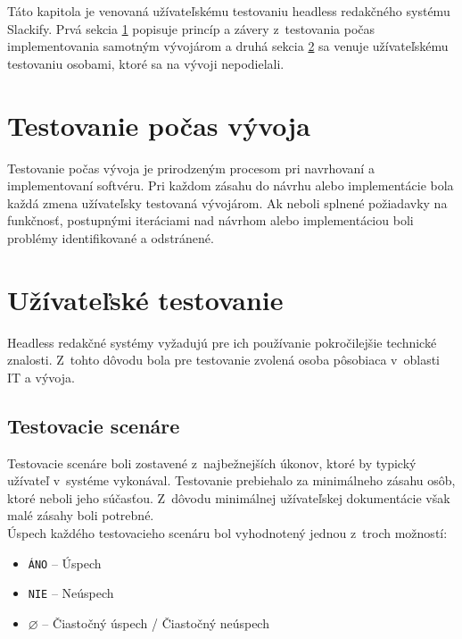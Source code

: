 Táto kapitola je venovaná užívateľskému testovaniu headless redakčného systému Slackify. Prvá sekcia \ref{test:dev} popisuje princíp a závery z~testovania počas implementovania samotným vývojárom a druhá sekcia \ref{test:user} sa venuje užívateľskému testovaniu osobami, ktoré sa na vývoji nepodielali.

\section{Testovanie počas vývoja}
\label{test:dev}
Testovanie počas vývoja je prirodzeným procesom pri navrhovaní a implementovaní softvéru. Pri každom zásahu do návrhu alebo implementácie bola každá zmena užívateľsky testovaná vývojárom. Ak neboli splnené požiadavky na funkčnosť, postupnými iteráciami nad návrhom alebo implementáciou boli problémy identifikované a odstránené.

\section{Užívateľské testovanie}
\label{test:user}
Headless redakčné systémy vyžadujú pre ich používanie pokročilejšie technické znalosti. Z~tohto dôvodu bola pre testovanie zvolená osoba pôsobiaca v~oblasti IT a vývoja.

\subsection{Testovacie scenáre}
Testovacie scenáre boli zostavené z~najbežnejších úkonov, ktoré by typický užívateľ v~systéme vykonával. Testovanie prebiehalo za minimálneho zásahu osôb, ktoré neboli jeho súčasťou. Z~dôvodu minimálnej užívateľskej dokumentácie však malé zásahy boli potrebné. \\

\noindent Úspech každého testovacieho scenáru bol vyhodnotený jednou z~troch možností:

\begin{itemize}
	\item \texttt{ÁNO} -- Úspech
	\item \texttt{NIE} -- Neúspech
	\item \texttt{$\varnothing$} -- Čiastočný úspech / Čiastočný neúspech
\end{itemize}

